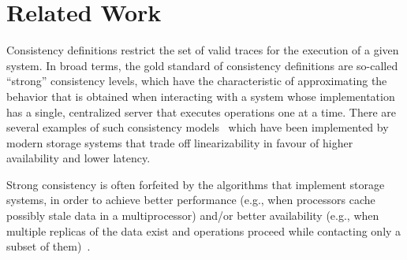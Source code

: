 \documentclass[journal,compsoc]{IEEEtran}
\begin{document}

 \section{Related Work} \label{sec:related}
 Consistency definitions restrict the set of valid traces for the execution of a given system. %
 In broad terms, the gold standard of consistency definitions are so-called ``strong'' consistency levels, which have the characteristic of approximating the behavior that is obtained when interacting with a system whose implementation has a single, centralized server that executes operations one at a time. There are several examples of such consistency models~\cite{Ahamad94causalmemory:, Attiya:1994:SCV:176575.176576, Herlihy:1990:LCC:78969.78972, Lamport:1979:MMC:1311099.1311750, opac-b1024856, Mizuno1995, Raynal1995} which have been implemented by modern storage systems that trade off linearizability in favour of higher availability and lower latency. %

Strong consistency is often forfeited by the algorithms that implement storage systems, in order to achieve better performance (e.g., when processors cache possibly stale data in a multiprocessor) and/or better availability (e.g., when multiple replicas of the data exist and operations proceed while contacting only a subset of them)~\cite{Lakshman:2010:CDS:1773912.1773922, Sumbaly_servinglarge-scale, Meiklejohn:2013:RPD:2505305.2505309, Plugge:2010:DGM:1869938, Schutt:2008:SRT:1411273.1411280, DeCandia:2007:DAH:1323293.1294281}.
\end{document}
